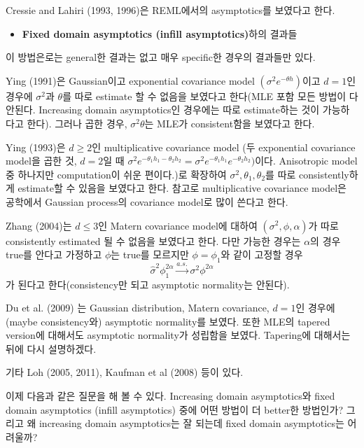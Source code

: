 \documentclass[b5paper,]{scrbook}
\providecommand{\tightlist}{%
  \setlength{\itemsep}{0pt}\setlength{\parskip}{0pt}}
\theoremstyle{plain}
\theoremstyle{definition}
\numberwithin{equation}{section}
\begin{document}
Cressie and Lahiri (1993, 1996)은 REML에서의 asymptotics를 보였다고 한다.

\begin{itemize}
\tightlist
\item
  \textbf{Fixed domain asymptotics (infill asymptotics)}하의 결과들
\end{itemize}

이 방법은로는 general한 결과는 없고 매우 specific한 경우의 결과들만 있다.

Ying (1991)은 Gaussian이고 exponential covariance model \((\sigma^{2}e^{-\theta h})\)이고 \(d=1\)인 경우에 \(\sigma^{2}\)과 \(\theta\)를 따로 estimate 할 수 없음을 보였다고 한다(MLE 포함 모든 방법이 다 안된다. Increasing domain asymptotics인 경우에는 따로 estimate하는 것이 가능하다고 한다). 그러나 곱한 경우, \(\sigma^{2}\theta\)는 MLE가 consistent함을 보였다고 한다.

Ying (1993)은 \(d \geq 2\)인 multiplicative covariance model (두 exponential covariance model을 곱한 것, \(d=2\)일 때 \(\sigma^{2}e^{-\theta_{1} h_{1}-\theta_{2}h_{2}}=\sigma^{2}e^{-\theta_{1}h_{1}}e^{-\theta_{2}h_{2}})\)이다. Anisotropic model 중 하나지만 computation이 쉬운 편이다.)로 확장하여 \(\sigma^{2}, \theta_{1}, \theta_{2}\)를 따로 consistently하게 estimate할 수 있음을 보였다고 한다. 참고로 multiplicative covariance model은 공학에서 Gaussian process의 covariance model로 많이 쓴다고 한다.

Zhang (2004)는 \(d \leq 3\)인 Matern covariance model에 대하여 \((\sigma^{2}, \phi, \alpha)\)가 따로 consistently estimated 될 수 없음을 보였다고 한다. 다만 가능한 경우는 \(\alpha\)의 경우 true를 안다고 가정하고 \(\phi\)는 true를 모르지만 \(\phi=\phi_{1}\)와 같이 고정할 경우
\[\hat{\sigma}^{2}\phi_{1}^{2\alpha} \stackrel{a.s.}{\rightarrow} \sigma^{2}\phi^{2\alpha}\]
가 된다고 한다(consistency만 되고 asymptotic normality는 안된다).

Du et al. (2009) 는 Gaussian distribution, Matern covariance, \(d=1\)인 경우에 (maybe consistency와) asymptotic normality를 보였다. 또한 MLE의 tapered version에 대해서도 asymptotic normality가 성립함을 보였다. Tapering에 대해서는 뒤에 다시 설명하겠다.

기타 Loh (2005, 2011), Kaufman et al (2008) 등이 있다.

이제 다음과 같은 질문을 해 볼 수 있다. Increasing domain asymptotics와 fixed domain asymptotics (infill asymptotics) 중에 어떤 방법이 더 better한 방법인가? 그리고 왜 increasing domain asymptotics는 잘 되는데 fixed domain asymptotics는 어려울까?
\end{document}
